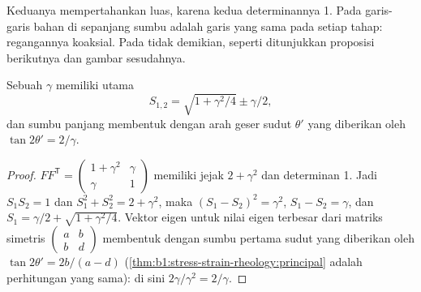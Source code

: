 Keduanya mempertahankan luas, karena kedua determinannya 1. Pada  garis-garis bahan di sepanjang sumbu  adalah garis yang sama pada setiap tahap: regangannya koaksial. Pada  tidak demikian, seperti ditunjukkan proposisi berikutnya dan gambar sesudahnya.

\begin{proposition}\label{prop:b1:stress-strain-rheology:simple-shear}
Sebuah  $\gamma$ memiliki  utama
\[
  S_{1,2} = \sqrt{1 + \gamma^2/4} \pm \gamma/2 ,
\]
dan sumbu panjang  membentuk dengan arah geser sudut $\theta'$ yang diberikan oleh $\tan2\theta' = 2/\gamma$.
\end{proposition}

\begin{proof}
$FF^{\mathsf T} = \begin{pmatrix} 1+\gamma^2 & \gamma \\ \gamma & 1\end{pmatrix}$
memiliki jejak $2+\gamma^2$ dan determinan 1. Jadi $S_1S_2 = 1$ dan
$S_1^2 + S_2^2 = 2 + \gamma^2$, maka $(S_1 - S_2)^2 = \gamma^2$,
$S_1 - S_2 = \gamma$, dan $S_1 = \gamma/2 + \sqrt{1+\gamma^2/4}$. Vektor
eigen untuk nilai eigen terbesar dari matriks simetris
$\begin{pmatrix} a & b \\ b & d\end{pmatrix}$ membentuk dengan sumbu pertama sudut
yang diberikan oleh $\tan2\theta' = 2b/(a-d)$ (\cref{thm:b1:stress-strain-rheology:principal}
adalah perhitungan yang sama): di sini $2\gamma/\gamma^2 = 2/\gamma$.
\end{proof}

